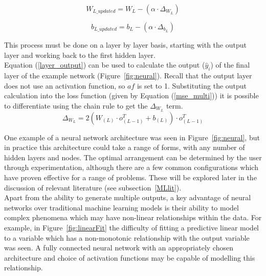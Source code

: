  \begin{equation} \label{W_GD}
	W_{L\_updated} = W_L - (\alpha \cdot \Delta_{W_L})
\end{equation}

 \begin{equation} \label{b_GD}
	b_{L\_updated} = b_L - (\alpha \cdot \Delta_{b_L})
\end{equation}

\noindent
This process must be done on a layer by layer basis, starting with the output layer and working back to the first hidden layer. \\

\noindent
 Equation (\ref{layer_output}) can be used to calculate the output ($\hat{y}_i$) of the final layer of the example network (Figure~\ref{fig:neural}). Recall that the output layer does not use an activation function, so $af$ is set to 1. Substituting the output calculation into the loss function (given by Equation (\ref{mse_multi})) it is possible to differentiate using the chain rule to get the $\Delta_{W_L}$ term.\\

\begin{equation} \label{delta_W}
	\Delta_{W_L} = 2(W_{(L)} \cdot o_{(L-1)}^T + b_{(L)}) \cdot o_{(L-1)}^T
\end{equation}

\noindent
One example of a neural network architecture was seen in Figure~\ref{fig:neural}, but in practice this architecture could take a range of forms, with any number of hidden layers and nodes. The optimal arrangement can be determined by the user through experimentation, although there are a few common configurations which have proven effective for a range of problems. These will be explored later in the discussion of relevant literature (see subsection~\ref{MLlit}). \\


\noindent
Apart from the ability to generate multiple outputs, a key advantage of neural networks over traditional machine learning models is their ability to model complex phenomena which may have non-linear relationships within the data. For example, in Figure~\ref{fig:linearFit} the difficulty of fitting a predictive linear model to a variable which has a non-monotonic relationship with the output variable was seen. A fully connected neural network with an appropriately chosen architecture and choice of activation functions may be capable of modelling this relationship. \\ 

